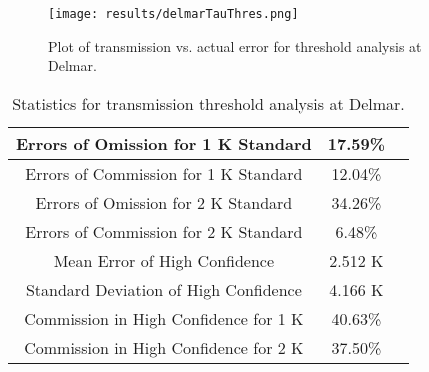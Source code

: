 \documentclass{book}
\begin{document}
\begin{minipage}[c]{0.47\textwidth}
\centering
\begin{figure}[H]
\texttt{[image: results/delmarTauThres.png]}
\caption{Plot of transmission vs. actual error for threshold analysis at Delmar.}
\label{fig:delmarTauThres}
\end{figure}
\end{minipage}
\begin{minipage}[c]{0.47\textwidth}
\begin{table}[H]
\centering
\footnotesize
\begin{tabular}{ | c | c | c | } \hline
Errors of Omission for 1 K Standard & 17.59\% \\ \hline
Errors of Commission for 1 K Standard & 12.04\% \\ \hline
Errors of Omission for 2 K Standard & 34.26\% \\ \hline
Errors of Commission for 2 K Standard & 6.48\% \\ \hline
Mean Error of High Confidence & 2.512 K \\ \hline
Standard Deviation of High Confidence & 4.166 K \\ \hline
Commission in High Confidence for 1 K & 40.63\% \\ \hline
Commission in High Confidence for 2 K & 37.50\% \\ \hline
\end{tabular}
\caption{Statistics for transmission threshold analysis at Delmar.}
\label{tab:delmarTauThres}
\end{table}
\end{minipage}
\end{document}
